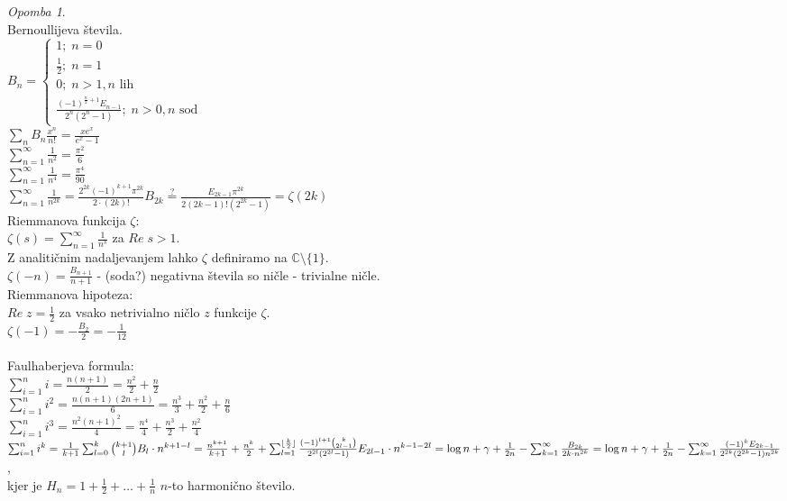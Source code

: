 \documentclass[a4paper, 12pt]{book}
\theoremstyle{definition}
\theoremstyle{remark}
\newtheorem*{rem}{Opomba}
\newcommand{\C}{\mathbb{C}}
\begin{document}
\begin{rem} \text{} \\
  Bernoullijeva števila. \\
  $B_n = \begin{cases}
    1; \; n = 0 \\
    \frac{1}{2}; \; n = 1 \\
    0; \; n > 1, n \text{ lih} \\
    \frac{(-1)^{\frac{n}{2} + 1} E_{n-1}}{2^n (2^n - 1)}; \; n > 0, n \text{ sod}
  \end{cases}$ \\
  $\sum_n B_n \frac{x^n}{n!} = \frac{x e^x}{e^x - 1}$ \\
  $\sum_{n=1}^{\infty} \frac{1}{n^2} = \frac{\pi^2}{6}$ \\
  $\sum_{n=1}^{\infty} \frac{1}{n^4} = \frac{\pi^4}{90}$ \\
  $\sum_{n=1}^{\infty} \frac{1}{n^{2k}} = \frac{2^{2k} (-1)^{k+1} \pi^{2k}}{2 \cdot (2k)!} B_{2k}
  \stackrel{?}{=} \frac{E_{2k-1} \pi^{2k}}{2 (2k-1)! (2^{2k}-1)} = \zeta(2k)$ \\
  Riemmanova funkcija $\zeta$: \\
  $\zeta(s) = \sum_{n=1}^{\infty} \frac{1}{n^s}$ za $Re \; s > 1$. \\
  Z analitičnim nadaljevanjem lahko $\zeta$ definiramo na $\C \setminus \{1\}$. \\
  $\zeta(-n) = \frac{B_{n+1}}{n+1}$ - (soda?) negativna števila so ničle - trivialne ničle. \\
  Riemmanova hipoteza: \\
  $Re \; z = \frac{1}{2}$ za vsako netrivialno ničlo $z$ funkcije $\zeta$. \\
  $\zeta(-1) = -\frac{B_2}{2} = -\frac{1}{12}$ \\
   \\
  Faulhaberjeva formula: \\
  $\sum_{i=1}^{n} i = \frac{n (n+1)}{2} = \frac{n^2}{2} + \frac{n}{2}$ \\
  $\sum_{i=1}^{n} i^2 = \frac{n (n+1) (2n+1)}{6} = \frac{n^3}{3} + \frac{n^2}{2} + \frac{n}{6}$ \\
  $\sum_{i=1}^{n} i^3 = \frac{n^2 (n+1)^2}{4} = \frac{n^4}{4} + \frac{n^3}{2} + \frac{n^2}{4}$ \\
  $\sum_{i=1}^{n} i^k = \frac{1}{k+1} \sum_{l=0}^{k} \binom{k+1}{l} B_l \cdot n^{k+1-l} \\
  = \frac{n^{k+1}}{k+1} + \frac{n^k}{2} + \sum_{l=1}^{\lfloor\frac{k}{2}\rfloor}
  \frac{(-1)^{l+1} \binom{k}{2l-1}}{2^{2l} (2^{2l}-1)} E_{2l-1} \cdot n^{k-1-2l} \\
  = \log n + \gamma + \frac{1}{2n} - \sum_{k=1}^{\infty} \frac{B_{2k}}{2k \cdot n^{2k}} \\
  = \log n + \gamma + \frac{1}{2n} - \sum_{k=1}^{\infty} \frac{(-1)^k E_{2k-1}}{2^{2k} (2^{2k} - 1) n^{2k}}$, \\
  kjer je $H_n = 1 + \frac{1}{2} + \dots + \frac{1}{n}$ $n$-to harmonično število.
\end{rem}
\end{document}

